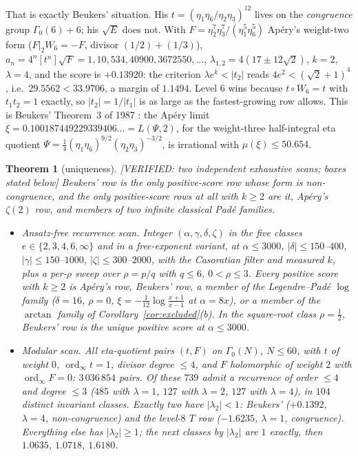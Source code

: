 \documentclass[11pt,reqno]{amsart}
\theoremstyle{plain}
\newtheorem{theorem}{Theorem}[section]
\theoremstyle{definition}
\theoremstyle{remark}
\theoremstyle{plain}
\DeclareMathOperator{\ord}{ord}
\newcommand{\VerifiedR}[1]{\textup{\textsf{[VERIFIED: #1]}}}
\begin{document}
That is exactly Beukers' situation. His $t=(\eta_1\eta_6/\eta_2\eta_3)^{12}$
lives on the \emph{congruence} group $\Gamma_0(6)+6$; his $\sqrt E$ does not.
With $F=\eta_2^7\eta_3^7/(\eta_1^5\eta_6^5)$ Ap\'ery's weight-two form
($F|_2W_6=-F$, divisor $(1/2)+(1/3)$),
$a_n=4^n[t^n]\sqrt F=1,10,534,40900,3672550,\dots$,
$\lambda_{1,2}=4(17\pm12\sqrt2)$, $k=2$, $\lambda=4$, and the score is
$+0.13920$: the criterion $\lambda e^k<|t_2|$ reads $4e^2<(\sqrt2+1)^4$, i.e.\
$29.5562<33.9706$, a margin of $1.1494$. Level $6$ wins because $t\circ W_6=t$
with $t_1t_2=1$ exactly, so $|t_2|=1/|t_1|$ is as large as the fastest-growing
row allows. This is Beukers' Theorem~3 of 1987 \cite{Beukers1987}: the Ap\'ery
limit $\xi=0.100187449229339406\ldots=L(\Psi,2)$, for the weight-three
half-integral eta quotient
$\Psi=\tfrac14(\eta_1\eta_6)^{9/2}(\eta_2\eta_3)^{-3/2}$, is irrational with
$\mu(\xi)\le50.654$.

\begin{theorem}[uniqueness]\label{thm:unique}
\VerifiedR{two independent exhaustive scans; boxes stated below}
Beukers' row is the only positive-score row whose form is non-congruence, and the
only positive-score rows at all with $k\ge2$ are it, Ap\'ery's $\zeta(2)$ row, and
members of two infinite classical Pad\'e families.
\begin{itemize}[leftmargin=1.6em]
\item \emph{Ansatz-free recurrence scan.} Integer $(\alpha,\gamma,\delta,\zeta)$
in the five classes $e\in\{2,3,4,6,\infty\}$ and in a free-exponent variant, at
$\alpha\le3000$, $|\delta|\le150$--$400$, $|\gamma|\le150$--$1000$,
$|\zeta|\le300$--$2000$, with the Casoratian filter and measured $k$, plus a
per-$\rho$ sweep over $\rho=p/q$ with $q\le6$, $0<\rho\le3$. Every positive score
with $k\ge2$ is Ap\'ery's row, Beukers' row, a member of the Legendre--Pad\'e
$\log$ family ($\delta=16$, $\rho=0$, $\xi=-\tfrac1{12}\log\frac{x+1}{x-1}$ at
$\alpha=8x$), or a member of the $\arctan$ family of
Corollary~\ref{cor:excluded}(b). In the square-root class $\rho=\tfrac12$,
Beukers' row is the \emph{unique} positive score at $\alpha\le3000$.
\item \emph{Modular scan.} All eta-quotient pairs $(t,F)$ on $\Gamma_0(N)$,
$N\le60$, with $t$ of weight $0$, $\ord_\infty t=1$, divisor degree $\le4$, and
$F$ holomorphic of weight $2$ with $\ord_\infty F=0$: $3\,036\,854$ pairs. Of
these $739$ admit a recurrence of order $\le4$ and degree $\le3$ ($485$ with
$\lambda=1$, $127$ with $\lambda=2$, $127$ with $\lambda=4$), in $104$ distinct
invariant classes. \emph{Exactly two} have $|\lambda_2|<1$: Beukers'
($+0.1392$, $\lambda=4$, non-congruence) and the level-$8$ $T$ row ($-1.6235$,
$\lambda=1$, congruence). Everything else has $|\lambda_2|\ge1$; the next classes
by $|\lambda_2|$ are $1$ exactly, then $1.0635$, $1.0718$, $1.6180$.
\end{itemize}
\end{theorem}
\end{document}

